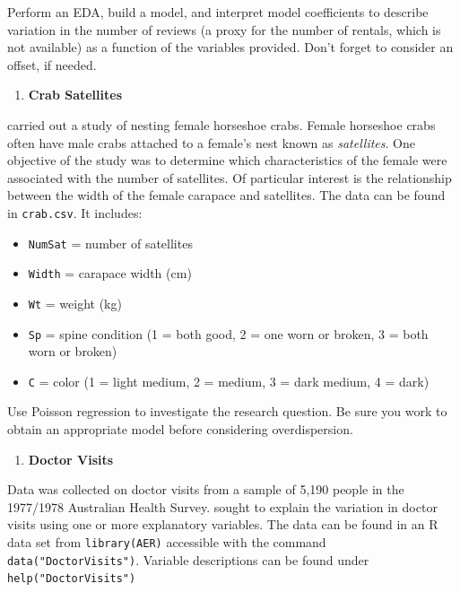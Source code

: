 \documentclass[
]{krantz}
\providecommand{\tightlist}{%
  \setlength{\itemsep}{0pt}\setlength{\parskip}{0pt}}
\begin{document}
Perform an EDA, build a model, and interpret model coefficients to describe variation in the number of reviews (a proxy for the number of rentals, which is not available) as a function of the variables provided. Don't forget to consider an offset, if needed.

\begin{enumerate}
\def\labelenumi{\arabic{enumi}.}
\setcounter{enumi}{1}
\tightlist
\item
  \textbf{Crab Satellites}
\end{enumerate}

\citet{Brockmann1996} carried out a study of nesting female horseshoe crabs. Female horseshoe crabs often have male crabs attached to a female's nest known as \emph{satellites}. One objective of the study was to determine which characteristics of the female were associated with the number of satellites. Of particular interest is the relationship between the width of the female carapace and satellites.
The data can be found in \texttt{crab.csv}. It includes:

\begin{itemize}
\tightlist
\item
  \texttt{NumSat} = number of satellites
\item
  \texttt{Width} = carapace width (cm)
\item
  \texttt{Wt} = weight (kg)
\item
  \texttt{Sp} = spine condition (1 = both good, 2 = one worn or broken, 3 = both worn or broken)
\item
  \texttt{C} = color (1 = light medium, 2 = medium, 3 = dark medium, 4 = dark)
\end{itemize}

Use Poisson regression to investigate the research question. Be sure you work to obtain an appropriate model before considering overdispersion.

\begin{enumerate}
\def\labelenumi{\arabic{enumi}.}
\setcounter{enumi}{2}
\tightlist
\item
  \textbf{Doctor Visits}
\end{enumerate}

Data was collected on doctor visits from a sample of 5,190 people in the 1977/1978 Australian Health Survey. \citet{Cameron1986} sought to explain the variation in doctor visits using one or more explanatory variables. The data can be found in an R data set from \texttt{library(AER)} accessible with the command \texttt{data("DoctorVisits")}. Variable descriptions can be found under \texttt{help("DoctorVisits")}
\end{document}
